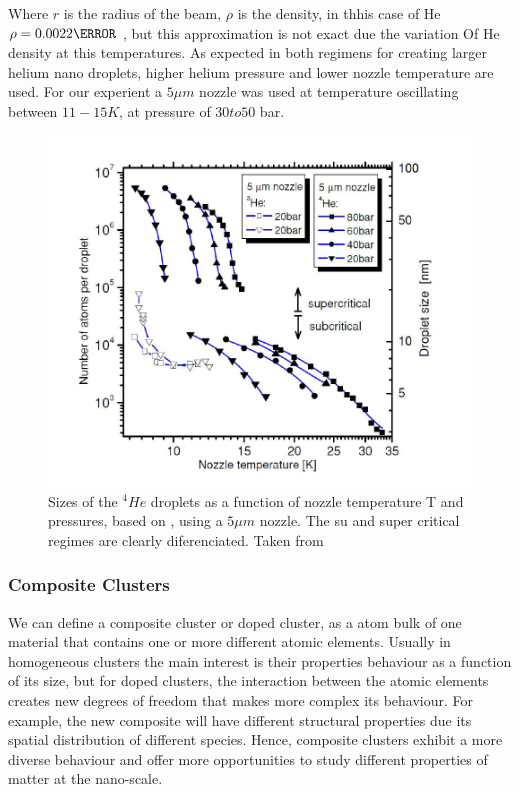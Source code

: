 Where $r$ is the radius of the beam, $\rho$ is the density, in thhis case of He $\rho =0.0022 \angstrom$ \cite{stringari_systematics_1987}, but this approximation is not exact due the variation Of He density at this temperatures. As expected in both regimens for creating larger helium nano droplets, higher helium pressure and lower nozzle temperature are used. For our experient a $5 \mu m$ nozzle was used at temperature oscillating between $11-15 K$, at pressure of $30 to 50$ bar.

\begin{figure}[hbtp]
\centering
\label{img:dropletSize}
\includegraphics[scale=1]{../Images/sizes_regimen.PNG}
\caption{ Sizes of the $^{4}He$ droplets  as a function of nozzle temperature T and  pressures, based on \cite{toennies_spectroscopy_1998}, using a $5 \mu m$ nozzle. The su and super critical regimes are clearly diferenciated. Taken from \cite{stienkemeier_spsectroscopy_2006}}
\end{figure}


\subsubsection{Composite Clusters}

We can define a composite cluster or doped cluster, as a atom  bulk of one material that contains one or more different atomic elements. Usually in homogeneous clusters the main interest is their properties behaviour as a function of its size, but for doped clusters, the interaction between the atomic elements creates new degrees of freedom that makes more complex its behaviour. For example, the new composite will have different structural properties due its spatial distribution of different species. Hence, composite clusters exhibit a more diverse behaviour and offer more opportunities to study different properties of matter at the nano-scale.


